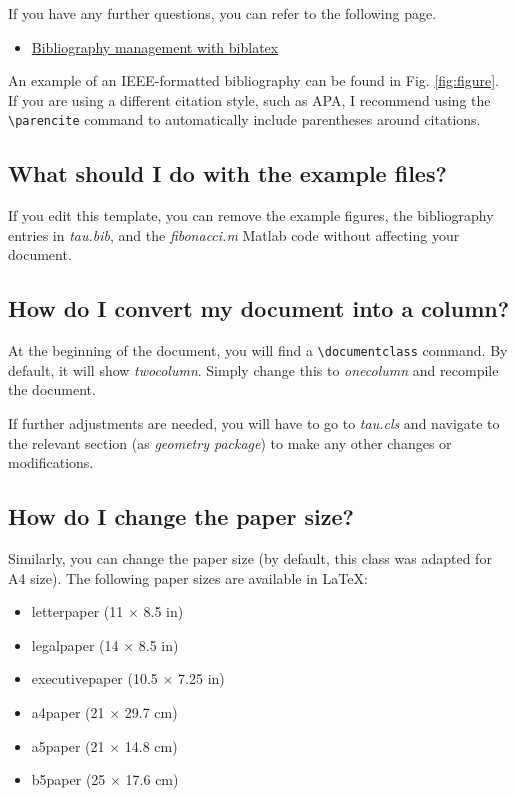 \documentclass[9pt,a4paper,twocolumn,twoside]{tau-class/tau}
\begin{document}
        If you have any further questions, you can refer to the following page.

        \begin{itemize}
            \item \href{https://es.overleaf.com/learn/latex/Bibliography_management_with_biblatex}{Bibliography management with biblatex}
        \end{itemize}
            
        An example of an IEEE-formatted bibliography can be found in Fig. \ref{fig:figure}. If you are using a different citation style, such as APA, I recommend using the \verb|\parencite| command to automatically include parentheses around citations.

    \subsection*{What should I do with the example files?}

        If you edit this template, you can remove the example figures, the bibliography entries in \textit{tau.bib}, and the \textit{fibonacci.m} Matlab code without affecting your document.

    \subsection*{How do I convert my document into a column?}

        At the beginning of the document, you will find a \verb|\documentclass| command. By default, it will show \textit{twocolumn}. Simply change this to \textit{onecolumn} and recompile the document. 
        
        If further adjustments are needed, you will have to go to \textit{tau.cls} and navigate to the relevant section (as \textit{geometry package}) to make any other changes or modifications.

    \subsection*{How do I change the paper size?}

        Similarly, you can change the paper size (by default, this class was adapted for A4 size). The following paper sizes are available in \LaTeX:

        \begin{itemize}
            \item letterpaper (11 $\times$ 8.5 in)
            \item legalpaper (14 $\times$ 8.5 in)
            \item executivepaper (10.5 $\times$ 7.25 in)
            \item a4paper (21 $\times$ 29.7 cm)
            \item a5paper (21 $\times$ 14.8 cm)
            \item b5paper (25 $\times$ 17.6 cm)
       \end{itemize}
\end{document}
